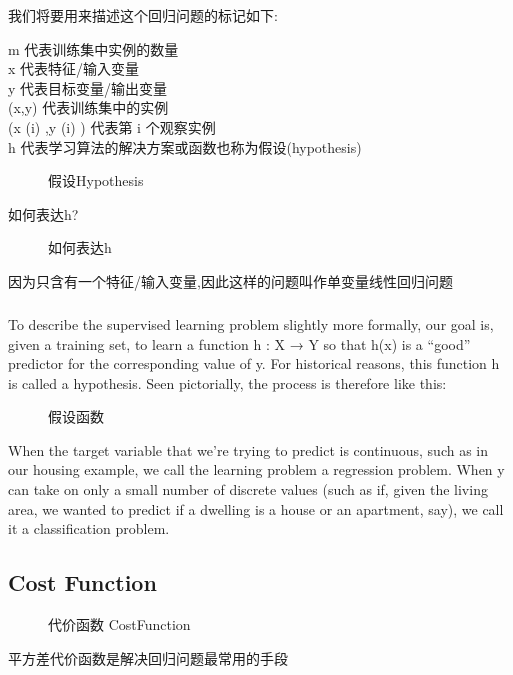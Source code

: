 \documentclass{article}
\begin{document}
\begin{CJK}{UTF8}{gbsn}
我们将要用来描述这个回归问题的标记如下:

m 代表训练集中实例的数量\\

x 代表特征/输入变量\\

y 代表目标变量/输出变量\\

(x,y) 代表训练集中的实例\\

(x (i) ,y (i) ) 代表第 i 个观察实例\\

h 代表学习算法的解决方案或函数也称为假设(hypothesis)\\
\begin{figure}[H]
\caption{假设Hypothesis}
\label{fig:6}
\end{figure}

如何表达h?
\begin{figure}[H]
\caption{如何表达h}
\label{fig:8}
\end{figure}
因为只含有一个特征/输入变量,因此这样的问题叫作单变量线性回归问题
\subparagraph*{}
To describe the supervised learning problem slightly more formally, our goal is, given a training set, to learn a function h : X → Y so that h(x) is a “good” predictor for the corresponding value of y. For historical reasons, this function h is called a hypothesis. Seen pictorially, the process is therefore like this:
\begin{figure}[H]
\caption{假设函数}
\label{fig:7}
\end{figure}
When the target variable that we’re trying to predict is continuous, such as in our housing example, we call the learning problem a regression problem. When y can take on only a small number of discrete values (such as if, given the living area, we wanted to predict if a dwelling is a house or an apartment, say), we call it a classification problem.
\subsection{Cost Function}
\begin{figure}[H]
\caption{代价函数 CostFunction}
\label{fig:9}
\end{figure}
平方差代价函数是解决回归问题最常用的手段


\end{CJK}
\end{document}
